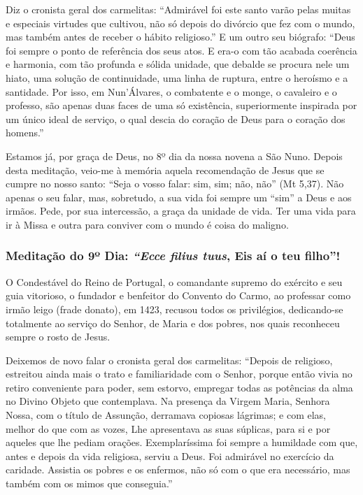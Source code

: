 \documentclass[a4paper,14pt]{extarticle} \usepackage[utf8]{inputenc}
\begin{document}
Diz o cronista geral dos carmelitas: “Admirável foi este santo varão pelas muitas e especiais virtudes que cultivou, não só depois do divórcio que fez com o mundo, mas também antes de receber o hábito religioso.” E um outro seu biógrafo: “Deus foi sempre o ponto de referência dos seus atos. E era-o com tão acabada coerência e harmonia, com tão profunda e sólida unidade, que debalde se procura nele um hiato, uma solução de continuidade, uma linha de ruptura, entre o heroísmo e a santidade. Por isso, em Nun’Álvares, o combatente e o monge, o cavaleiro e o professo, são apenas duas faces de uma só existência, superiormente inspirada por um único ideal de serviço, o qual descia do coração de Deus para o coração dos homens.”

Estamos já, por graça de Deus, no 8º dia da nossa novena a São Nuno. Depois desta meditação, veio-me à memória aquela recomendação de Jesus que se cumpre no nosso santo: “Seja o vosso falar: sim, sim; não, não” (Mt 5,37). Não apenas o seu falar, mas, sobretudo, a sua vida foi sempre um “sim” a Deus e aos irmãos. Pede, por sua intercessão, a graça da unidade de vida. Ter uma vida para ir à Missa e outra para conviver com o mundo é coisa do maligno.


\subsubsection{Meditação do 9º Dia: \textit{“Ecce filius tuus}, Eis aí o teu filho”!}

O Condestável do Reino de Portugal, o comandante supremo do exército e seu guia vitorioso, o fundador e benfeitor do Convento do Carmo, ao professar como irmão leigo (frade donato), em 1423, recusou todos os privilégios, dedicando-se totalmente ao serviço do Senhor, de Maria e dos pobres, nos quais reconheceu sempre o rosto de Jesus.

Deixemos de novo falar o cronista geral dos carmelitas: “Depois de religioso, estreitou ainda mais o trato e familiaridade com o Senhor, porque então vivia no retiro conveniente para poder, sem estorvo, empregar todas as potências da alma no Divino Objeto que contemplava. Na presença da Virgem Maria, Senhora Nossa, com o título de Assunção, derramava copiosas lágrimas; e com elas, melhor do que com as vozes, Lhe apresentava as suas súplicas, para si e por aqueles que lhe pediam orações. Exemplaríssima foi sempre a humildade com que, antes e depois da vida religiosa, serviu a Deus. Foi admirável no exercício da caridade. Assistia os pobres e os enfermos, não só com o que era necessário, mas também com os mimos que conseguia.”
\end{document}
